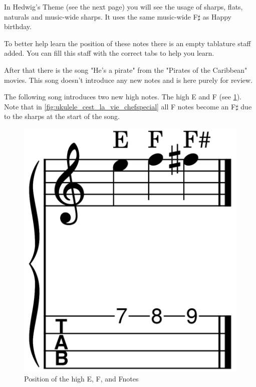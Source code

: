 In Hedwig's Theme (see the next page) you will see the usage of sharps, flats, naturals and music-wide sharps. It uses the same music-wide F$\sharp$ as Happy birthday.

To better help learn the position of these notes there is an empty tablature staff added. You can fill this staff with the correct tabs to help you learn.

After that there is the song "He's a pirate" from the "Pirates of the Caribbean" movies. This song doesn't introduce any new notes and is here purely for review.





The following song introduces two new high notes. The high E and F (see \ref{fig:ukulele_high_e_f_notes}). Note that in \autoref{fig:ukulele_cest_la_vie_chefspecial} all F notes become an F$\sharp$ due to the sharps at the start of the song.

\begin{figure}[h]
	\centering
	\includegraphics[height=0.12\textheight]{../../MuseScore/Ukulele/UkuleleHighEF.png}
	\caption{Position of the high E, F, and F\sharp notes}
	\label{fig:ukulele_high_e_f_notes}
\end{figure}


